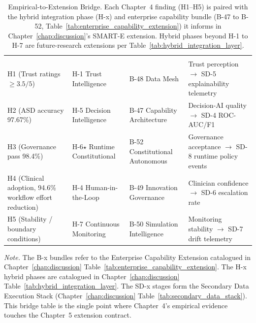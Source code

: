 

{\tablestripes\tablefontsize
\begin{xltabular}{\textwidth}{@{} >{\raggedright\arraybackslash}p{2.4cm} >{\raggedright\arraybackslash}p{3.0cm} >{\raggedright\arraybackslash}p{2.4cm} L @{}}
\caption[Empirical-to-Extension Bridge]{Empirical-to-Extension Bridge. Each Chapter~4 finding (H1--H5) is paired with the hybrid integration phase (H-x) and enterprise capability bundle (B-47 to B-52, Table~\ref{tab:enterprise_capability_extension}) it informs in Chapter~\ref{chap:discussion}'s SMART-E extension. Hybrid phases beyond H-1 to H-7 are future-research extensions per Table~\ref{tab:hybrid_integration_layer}.}\label{tab:ch4_empirical_to_extension_bridge} \\
\toprule
{} &  &  &  \\
\midrule
\endfirsthead
\toprule
{} &  &  &  \\
\midrule
\endhead
\bottomrule
\endlastfoot
H1 (Trust ratings $\geq 3.5/5$) & H-1 Trust Intelligence & B-48 Data Mesh & Trust perception $\to$ SD-5 explainability telemetry \\
H2 (ASD accuracy 97.67\%) & H-5 Decision Intelligence & B-47 Capability Architecture & Decision-AI quality $\to$ SD-4 ROC-AUC/F1 \\
H3 (Governance pass 98.4\%) & H-6$\star$ Runtime Constitutional & B-52 Constitutional Autonomous & Governance acceptance $\to$ SD-8 runtime policy events \\
H4 (Clinical adoption, 94.6\% workflow effort reduction) & H-4 Human-in-the-Loop & B-49 Innovation Governance & Clinician confidence $\to$ SD-6 escalation rate \\
H5 (Stability / boundary conditions) & H-7 Continuous Monitoring & B-50 Simulation Intelligence & Monitoring stability $\to$ SD-7 drift telemetry \\
\end{xltabular}}
\vspace{0.5em}
\noindent\textit{Note.} The B-x bundles refer to the Enterprise Capability Extension catalogued in Chapter~\ref{chap:discussion} Table~\ref{tab:enterprise_capability_extension}. The H-x hybrid phases are catalogued in Chapter~\ref{chap:discussion} Table~\ref{tab:hybrid_integration_layer}. The SD-x stages form the Secondary Data Execution Stack (Chapter~\ref{chap:discussion} Table~\ref{tab:secondary_data_stack}). This bridge table is the single point where Chapter~4's empirical evidence touches the Chapter~5 extension contract.

